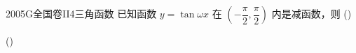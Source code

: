 
\begin{problem}{2005}{G}{全国卷II}{4}{三角函数}
已知函数 $ y=\tan\omega x $ 在 $ \left(-\dfrac{\pi}{2},\dfrac{\pi}{2}\right) $ 内是减函数，则 (\hspace{1cm})

(\hspace{1cm})
\begin{choices}
\end{choices}
\end{problem}

\begin{answer}

\end{answer}

\begin{solutions}

\end{solutions}